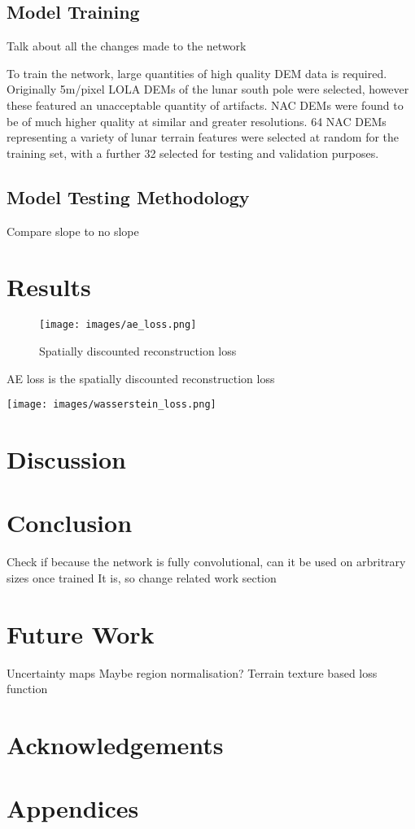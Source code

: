 \documentclass[twocolumn]{article}
\begin{document}
\subsection{Model Training}
\label{sec:org0f99b88}
Talk about all the changes made to the network

To train the network, large quantities of high quality DEM data is required.
Originally 5m/pixel LOLA DEMs of the lunar south pole were selected, however these featured an unacceptable quantity of artifacts.
NAC DEMs were found to be of much higher quality at similar and greater resolutions.
64 NAC DEMs\autocite{LROCRDRProduct} representing a variety of lunar terrain features were selected at random for the training set, with a further 32 selected for testing and validation purposes.
\subsection{Model Testing Methodology}
\label{sec:orgbdc5be8}


Compare slope to no slope


\section{Results}
\label{sec:org7690a86}

\begin{figure}[htbp]
\centering
\texttt{[image: images/ae\_loss.png]}
\caption{\label{fig:ae_loss}Spatially discounted reconstruction loss}
\end{figure}

AE loss is the spatially discounted reconstruction loss\autocite{zhangVoidFillingBased2020}

\begin{center}
\texttt{[image: images/wasserstein\_loss.png]}
\end{center}


\section{Discussion}
\label{sec:orgbdaa8c3}

\section{Conclusion}
\label{sec:orgc6f9fd6}
Check if because the network is fully convolutional, can it be used on arbritrary sizes once trained
It is, so change related work section


\section{Future Work}
\label{sec:org8dd807e}

Uncertainty maps
Maybe region normalisation?\autocite{yuRegionNormalizationImage2023}
Terrain texture based loss function

\section*{Acknowledgements}

\printbibliography

\section*{Appendices}
\end{document}
